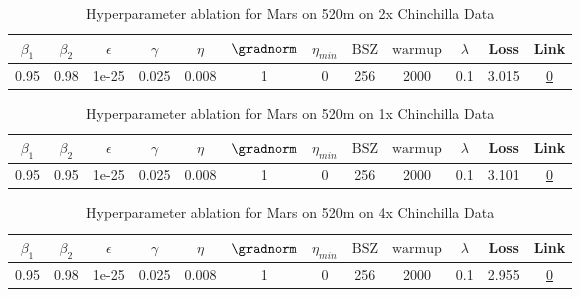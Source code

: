 \begin{table}[H]
\centering
\caption{Hyperparameter ablation for Mars on 520m on 2x Chinchilla Data}
\label{tab:ablation_mars_520m_2}
\begin{tabular}{cccccccccccc}
\toprule
$\beta_1$ & $\beta_2$ & $\epsilon$ & $\gamma$ & $\eta$ & $\gradnorm$ & $\eta_{min}$ & $\mathrm{BSZ}$ & $\mathrm{warmup}$ & $\lambda$ & Loss & Link \\
\midrule
0.95 & 0.98 & 1e-25 & 0.025 & 0.008 & 1 & 0 & 256 & 2000 & 0.1 & 3.015 & \href{https://wandb.ai/stanford-mercury/optimizer-scaling/runs/sweep-520m-21B-mars1ddcddlr0.008-wd0.1-minlr0-warmup2000-b10.95--e9c503}{0} \\
\midrule
\bottomrule
\end{tabular}
\end{table}

\begin{table}[H]
\centering
\caption{Hyperparameter ablation for Mars on 520m on 1x Chinchilla Data}
\label{tab:ablation_mars_520m_1}
\begin{tabular}{cccccccccccc}
\toprule
$\beta_1$ & $\beta_2$ & $\epsilon$ & $\gamma$ & $\eta$ & $\gradnorm$ & $\eta_{min}$ & $\mathrm{BSZ}$ & $\mathrm{warmup}$ & $\lambda$ & Loss & Link \\
\midrule
0.95 & 0.95 & 1e-25 & 0.025 & 0.008 & 1 & 0 & 256 & 2000 & 0.1 & 3.101 & \href{https://wandb.ai/stanford-mercury/optimizer-scaling/runs/sweep-520m-10B-mars5423a5lr0.008-wd0.1-minlr0-warmup2000-b10.95--3bb28e}{0} \\
\midrule
\bottomrule
\end{tabular}
\end{table}

\begin{table}[H]
\centering
\caption{Hyperparameter ablation for Mars on 520m on 4x Chinchilla Data}
\label{tab:ablation_mars_520m_4}
\begin{tabular}{cccccccccccc}
\toprule
$\beta_1$ & $\beta_2$ & $\epsilon$ & $\gamma$ & $\eta$ & $\gradnorm$ & $\eta_{min}$ & $\mathrm{BSZ}$ & $\mathrm{warmup}$ & $\lambda$ & Loss & Link \\
\midrule
0.95 & 0.98 & 1e-25 & 0.025 & 0.008 & 1 & 0 & 256 & 2000 & 0.1 & 2.955 & \href{https://wandb.ai/stanford-mercury/optimizer-scaling/runs/sweep-520m-42B-mars50507flr0.008-wd0.1-minlr0-warmup2000-b10.95--b5cf73}{0} \\
\midrule
\bottomrule
\end{tabular}
\end{table}

